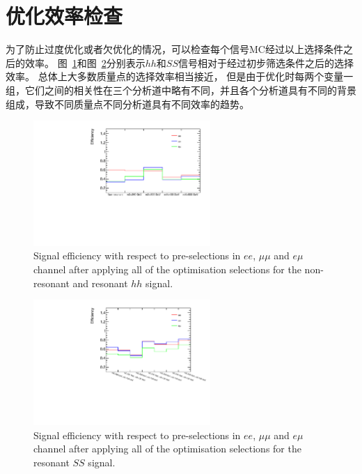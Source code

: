 \section{优化效率检查}
为了防止过度优化或者欠优化的情况，可以检查每个信号MC经过以上选择条件之后的效率。
图~\ref {fig:eff_sigopt_hh}和图~\ref {fig:eff_sigopt_SS}分别表示$hh$和$SS$信号相对于经过初步筛选条件之后的选择效率。 总体上大多数质量点的选择效率相当接近，
 但是由于优化时每两个变量一组，它们之间的相关性在三个分析道中略有不同，并且各个分析道具有不同的背景组成，导致不同质量点不同分析道具有不同效率的趋势。
 \begin{figure}[h]
\begin{center}
\includegraphics[width = 0.60\textwidth,angle=-90]{fig/SigOpt/eff_sigopt_hh.pdf}
\caption{Signal efficiency with respect to pre-selections in $ee$, $\mu\mu$ and $e\mu$ channel after applying all of the optimisation selections
for the non-resonant and resonant $hh$ signal.}
\label{fig:eff_sigopt_hh}
\end{center}
\end{figure}

\begin{figure}[h]
\begin{center}
\includegraphics[width = 0.60\textwidth,angle=-90]{fig/SigOpt/eff_sigopt_SS.pdf}
\caption{Signal efficiency with respect to pre-selections in $ee$, $\mu\mu$ and $e\mu$ channel after applying all of the optimisation selections
for the resonant $SS$ signal.}
\label{fig:eff_sigopt_SS}
\end{center}
\end{figure}

